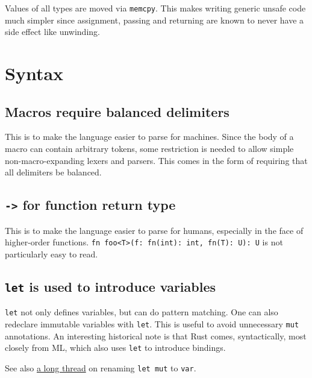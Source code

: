 \documentclass[]{article}
\begin{document}
Values of all types are moved via \texttt{memcpy}. This makes writing
generic unsafe code much simpler since assignment, passing and returning
are known to never have a side effect like unwinding.

\section{Syntax}\label{syntax}

\subsection{Macros require balanced
delimiters}\label{macros-require-balanced-delimiters}

This is to make the language easier to parse for machines. Since the
body of a macro can contain arbitrary tokens, some restriction is needed
to allow simple non-macro-expanding lexers and parsers. This comes in
the form of requiring that all delimiters be balanced.

\subsection{\texttt{-\textgreater{}} for function return
type}\label{for-function-return-type}

This is to make the language easier to parse for humans, especially in
the face of higher-order functions.
\texttt{fn foo\textless{}T\textgreater{}(f: fn(int): int, fn(T): U): U}
is not particularly easy to read.

\subsection{\texttt{let} is used to introduce
variables}\label{let-is-used-to-introduce-variables}

\texttt{let} not only defines variables, but can do pattern matching.
One can also redeclare immutable variables with \texttt{let}. This is
useful to avoid unnecessary \texttt{mut} annotations. An interesting
historical note is that Rust comes, syntactically, most closely from ML,
which also uses \texttt{let} to introduce bindings.

See also
\href{https://mail.mozilla.org/pipermail/rust-dev/2014-January/008319.html}{a
long thread} on renaming \texttt{let mut} to \texttt{var}.
\end{document}
